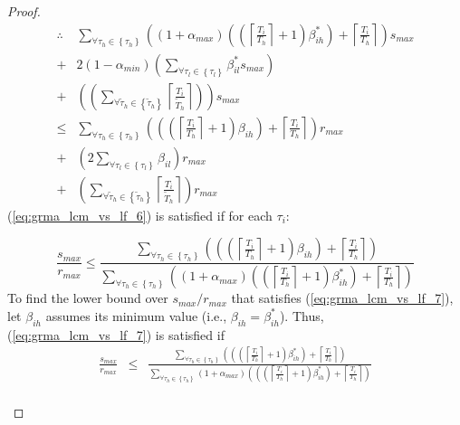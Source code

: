 \begin{proof}
\begin{eqnarray}
\therefore & \sum_{\forall\tau_{h}\in\left\{ \tau_{h}\right\} }\left(\left(1+\alpha_{max}\right)\left(\left(\left\lceil \frac{T_{i}}{T_{h}}\right\rceil +1\right)\beta_{ih}^{*}\right)+\left\lceil \frac{T_{i}}{T_{h}}\right\rceil \right)s_{max}\nonumber \\
+ & 2\left(1-\alpha_{min}\right)\left(\sum_{\forall\tau_{l}\in\left\{ \tau_{l}\right\} }\beta_{il}^{*}s_{max}\right)\nonumber \\
+ & \left(\left(\sum_{\forall\tilde{\tau}_{h}\in\left\{ \tilde{\tau}_{h}\right\} }\left\lceil \frac{T_{i}}{\tilde{T}_{h}}\right\rceil \right)\right)s_{max}\nonumber \\
\le & \sum_{\forall\tau_{h}\in\left\{ \tau_{h}\right\} }\left(\left(\left(\left\lceil \frac{T_{i}}{T_{h}}\right\rceil +1\right)\beta_{ih}\right)+\left\lceil \frac{T_{i}}{T_{h}}\right\rceil \right)r_{max}\nonumber \\
+ & \left(2\sum_{\forall\tau_{l}\in\left\{ \tau_{l}\right\} }\beta_{il}\right)r_{max}\nonumber \\
+ & \left(\sum_{\forall\tilde{\tau}_{h}\in\left\{ \tilde{\tau}_{h}\right\} }\left\lceil \frac{T_{i}}{\tilde{T}_{h}}\right\rceil \right)r_{max}\label{eq:grma_lcm_vs_lf_6}
\end{eqnarray}
 (\ref{eq:grma_lcm_vs_lf_6}) is satisfied if for each $\tau_{i}$:
%
\begin{compactitem}
%
\item 
\begin{equation}
\frac{s_{max}}{r_{max}}\le\frac{\sum_{\forall\tau_{h}\in\left\{ \tau_{h}\right\} }\left(\left(\left(\left\lceil \frac{T_{i}}{T_{h}}\right\rceil +1\right)\beta_{ih}\right)+\left\lceil \frac{T_{i}}{T_{h}}\right\rceil \right)}{\sum_{\forall\tau_{h}\in\left\{ \tau_{h}\right\} }\left(\left(1+\alpha_{max}\right)\left(\left(\left\lceil \frac{T_{i}}{T_{h}}\right\rceil +1\right)\beta_{ih}^{*}\right)+\left\lceil \frac{T_{i}}{T_{h}}\right\rceil \right)}\label{eq:grma_lcm_vs_lf_7}
\end{equation}
To find the lower bound over $s_{max}/r_{max}$ that satisfies (\ref{eq:grma_lcm_vs_lf_7}),
let $\beta_{ih}$ assumes its minimum value (i.e., $\beta_{ih}=\beta_{ih}^{*}$).
Thus, (\ref{eq:grma_lcm_vs_lf_7}) is satisfied if 
\begin{eqnarray}
\frac{s_{max}}{r_{max}} & \le & \frac{\sum_{\forall\tau_{h}\in\left\{ \tau_{h}\right\} }\left(\left(\left(\left\lceil \frac{T_{i}}{T_{h}}\right\rceil +1\right)\beta_{ih}^{*}\right)+\left\lceil \frac{T_{i}}{T_{h}}\right\rceil \right)}{\sum_{\forall\tau_{h}\in\left\{ \tau_{h}\right\} }\left(1+\alpha_{max}\right)\left(\left(\left(\left\lceil \frac{T_{i}}{T_{h}}\right\rceil +1\right)\beta_{ih}^{*}\right)+\left\lceil \frac{T_{i}}{T_{h}}\right\rceil \right)}\nonumber \\

\end{eqnarray}
\end{compactitem}
\end{proof}
